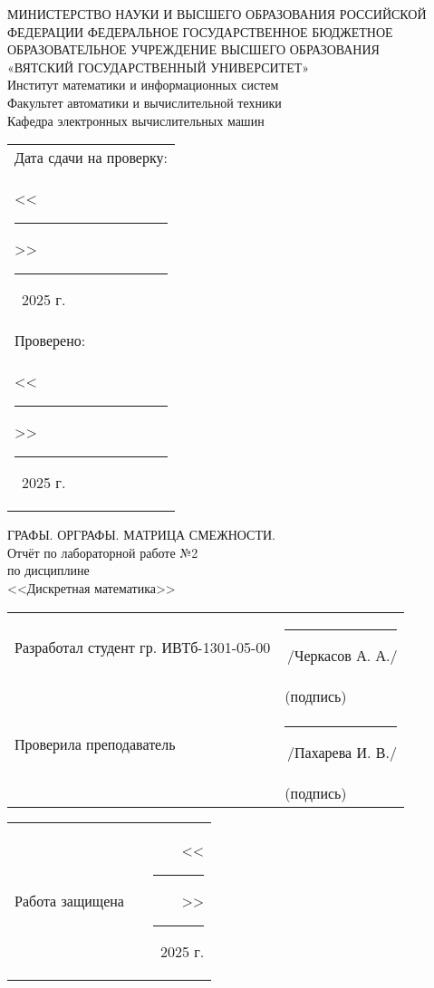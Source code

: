 \documentclass[oneside,a4paper,14pt]{extarticle}
\begin{document}
\newpage
\thispagestyle{empty}
\begin{center}
	МИНИСТЕРСТВО НАУКИ И ВЫСШЕГО ОБРАЗОВАНИЯ РОССИЙСКОЙ ФЕДЕРАЦИИ ФЕДЕРАЛЬНОЕ ГОСУДАРСТВЕННОЕ БЮДЖЕТНОЕ ОБРАЗОВАТЕЛЬНОЕ УЧРЕЖДЕНИЕ ВЫСШЕГО ОБРАЗОВАНИЯ\\
	«ВЯТСКИЙ ГОСУДАРСТВЕННЫЙ УНИВЕРСИТЕТ»\\
	Институт математики и информационных систем\\
	Факультет автоматики и вычислительной техники\\
	Кафедра электронных вычислительных машин
\end{center}
\vspace{10mm}

\hfill
\begin{tabular}{l}
  \footnotesize Дата сдачи на проверку: \\
  \footnotesize <<\rule[-1mm]{5mm}{0.10mm}\/>>\rule[-1mm]{20mm}{0.10mm}\ 2025 г.\\
  \footnotesize Проверено: \\
  \footnotesize <<\rule[-1mm]{5mm}{0.10mm}\/>>\rule[-1mm]{20mm}{0.10mm}\ 2025 г. \\
\end{tabular}
\vfill

\begin{center}
    ГРАФЫ. ОРГРАФЫ. МАТРИЦА СМЕЖНОСТИ.\\
	Отчёт по лабораторной работе №2\\
	по дисциплине\\
	<<Дискретная математика>>\\
\end{center}
\vspace{25mm}
\noindent
\begin{tabular}{ll}
	Разработал студент гр. ИВТб-1301-05-00 & \rule[-1mm]{30mm}{0.10mm}\,/Черкасов А. А./   \\
	                                       & \hspace{8mm}\footnotesize(подпись)            \\
	Проверила преподаватель                & \rule[-1mm]{30mm}{0.10mm}\,/Пахарева И. В./ \\
	                                       & \hspace{8mm}\footnotesize(подпись)            \\
\end{tabular}

\noindent
  \begin{tabular}{lp{58mm}r}
    Работа защищена &  & <<\rule[-1mm]{5mm}{0.10mm}\/>>\rule[-1mm]{30mm}{0.10mm}\ 2025 г.
  \end{tabular}
  \vfill
\end{document}
